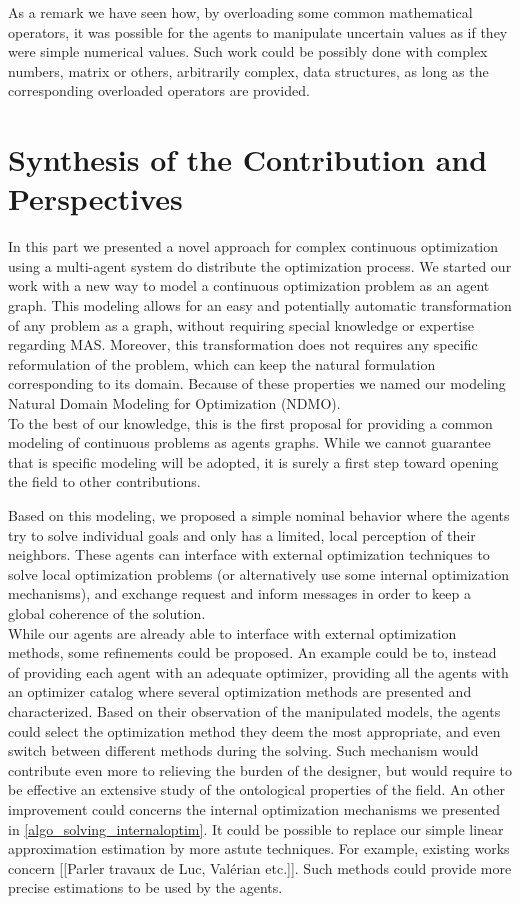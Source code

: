 As a remark we have seen how, by overloading some common mathematical operators, it was possible for the agents to manipulate uncertain values as if they were simple numerical values. Such work could be possibly done with complex numbers, matrix or others, arbitrarily complex, data structures, as long as the corresponding overloaded operators are provided.

\chapter{Synthesis of the Contribution and Perspectives}

In this part we presented a novel approach for complex continuous optimization using a multi-agent system do distribute the optimization process. We started our work with a new way to model a continuous optimization problem as an agent graph. This modeling allows for an easy and potentially automatic transformation of any problem as a graph, without requiring special knowledge or expertise regarding MAS. Moreover, this transformation does not requires any specific reformulation of the problem,  which can keep the natural formulation corresponding to its domain. Because of these properties we named our modeling Natural Domain Modeling for Optimization (NDMO).
\\
To the best of our knowledge, this is the first proposal for providing a common modeling of continuous problems as agents graphs. While we cannot guarantee that is specific modeling will be adopted, it is surely a first step toward opening the field to other contributions. 

Based on this modeling, we proposed a simple nominal behavior where the agents try to solve individual goals and only has a limited, local perception of their neighbors. These agents can interface with external optimization techniques to solve local optimization problems (or alternatively use some internal optimization mechanisms), and exchange request and inform messages in order to keep a global coherence of the solution.
\\
While our agents are already able to interface with external optimization methods, some refinements could be proposed. An example could be to, instead of providing each agent with an adequate optimizer, providing all the agents with an optimizer catalog where several optimization methods are presented and characterized. Based on their observation of the manipulated models, the agents could select the optimization method they deem the most appropriate, and even switch between different methods during the solving. Such mechanism would contribute even more to relieving the burden of  the designer, but would require to be effective an extensive study of the ontological properties of the field. An other improvement could concerns the internal optimization mechanisms we presented in \algorithmname{} \ref{algo_solving_internaloptim}. It could be possible to replace our simple linear approximation estimation by more astute techniques. For example, existing works concern  [[Parler travaux de Luc, Valérian etc.]]. Such methods could provide more precise estimations to be used by the agents.

